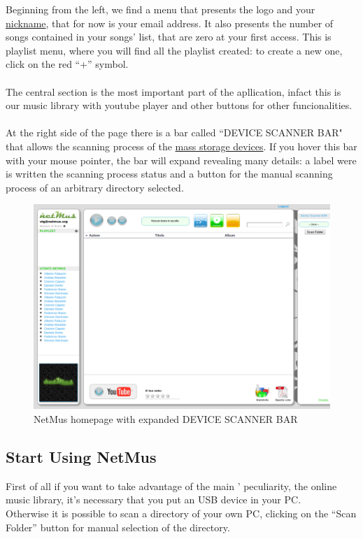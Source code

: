 Beginning from the left, we find a menu that presents the  logo and
your \underline{nickname}, that for now is your email address. It also presents
the number of songs contained in your songs' list, that are zero at your first
access. This is playlist menu, where you will find all the playlist created: 
to create a new one, click on the red ``+'' symbol.\\
\\
The central section is the most important part of the apllication, infact this
is our music library with youtube player and other buttons for other
funcionalities.\\
\\
At the right side of the page there is a bar called ``DEVICE SCANNER BAR" that
allows the scanning process of the \underline{mass storage devices}. If you
hover this bar with your mouse pointer, the bar will expand revealing many details: a label were is
written  the scanning process status and a button for the manual scanning
process of an arbitrary directory selected.\\

\begin{figure}[htbp]
  \centering
  \includegraphics[width=15cm]{img/MU/applet_bar_open.png}
\caption{NetMus homepage with expanded DEVICE SCANNER BAR}
\end{figure}

\subsection{Start Using NetMus}

First of all if you want to take advantage of the main ' peculiarity,
the online music library, it's necessary that you put an USB device in your PC.\\
Otherwise it is possible to scan a directory of your own PC, clicking
on the ``Scan Folder'' button for manual selection of the directory.\\ 

